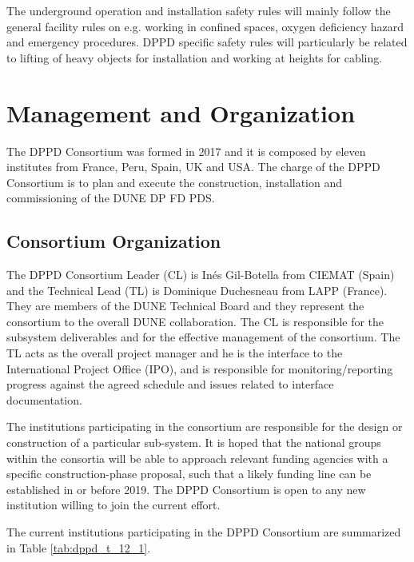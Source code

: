 The underground operation and installation safety rules will mainly follow the general facility rules on e.g. working in confined spaces, oxygen deficiency hazard and emergency procedures. DPPD specific safety rules will particularly be related to lifting of heavy objects for installation and working at heights for cabling.

\section{Management and Organization}
\label{sec:fddp-pd-12}

The DPPD Consortium was formed in 2017 and it is composed by eleven institutes from France, Peru, Spain, UK and USA. The charge of the DPPD Consortium is to plan and execute the construction, installation and commissioning of the DUNE DP FD PDS.

\subsection{Consortium Organization}
\label{sec:fddp-pd-12.1}

The DPPD Consortium Leader (CL) is In\'{e}s Gil-Botella from CIEMAT (Spain) and the Technical Lead (TL) is Dominique Duchesneau from LAPP (France). They are members of the DUNE Technical Board and they represent the consortium to the overall DUNE collaboration. The CL is responsible for the subsystem deliverables and for the effective management of the consortium. The TL acts as the overall project manager and he is the interface to the International Project Office (IPO), and is responsible for monitoring/reporting progress against the agreed schedule and issues related to interface documentation.

The institutions participating in the consortium are responsible for the design or construction of a particular sub-system. It is hoped that the national groups within the consortia will be able to approach relevant funding agencies with a specific construction-phase proposal, such that a likely funding line can be established in or before 2019. The DPPD Consortium is open to any new institution willing to join the current effort.

The current institutions participating in the DPPD Consortium are summarized in Table \ref{tab:dppd_t_12_1}.

